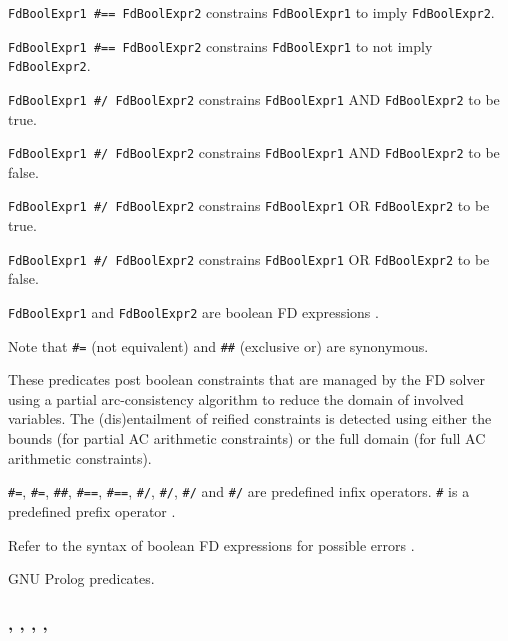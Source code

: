 \texttt{FdBoolExpr1 \#=={\gt} FdBoolExpr2} constrains
\texttt{FdBoolExpr1} to imply \texttt{FdBoolExpr2}.

\texttt{FdBoolExpr1 \#{\bs}=={\gt} FdBoolExpr2} constrains
\texttt{FdBoolExpr1} to not imply \texttt{FdBoolExpr2}.

\texttt{FdBoolExpr1 \#/{\bs} FdBoolExpr2} constrains \texttt{FdBoolExpr1}
AND \texttt{FdBoolExpr2} to be true.

\texttt{FdBoolExpr1 \#{\bs}/{\bs} FdBoolExpr2} constrains
\texttt{FdBoolExpr1} AND \texttt{FdBoolExpr2} to be false.

\texttt{FdBoolExpr1 \#{\bs}/ FdBoolExpr2} constrains \texttt{FdBoolExpr1}
OR \texttt{FdBoolExpr2} to be true.

\texttt{FdBoolExpr1 \#{\bs}{\bs}/ FdBoolExpr2} constrains
\texttt{FdBoolExpr1} OR \texttt{FdBoolExpr2} to be false.

\texttt{FdBoolExpr1} and \texttt{FdBoolExpr2} are boolean FD expressions
.

Note that \texttt{\#{\bs}{\lt}={\gt}} (not equivalent) and \texttt{\#\#}
(exclusive or) are synonymous.

These predicates post boolean constraints that are managed by the FD solver
using a partial arc-consistency algorithm to reduce the domain of involved
variables. The (dis)entailment of reified constraints is detected using
either the bounds (for partial AC arithmetic constraints) or the full domain
(for full AC arithmetic constraints).

\texttt{\#{\lt}={\gt}}, \texttt{\#{\bs}{\lt}={\gt}}, \texttt{\#\#},
\texttt{\#=={\gt}}, \texttt{\#{\bs}=={\gt}}, \texttt{\#/{\bs}},
\texttt{\#{\bs}/{\bs}}, \texttt{\#{\bs}/} and \texttt{\#{\bs}{\bs}/} are
predefined infix operators. \texttt{\#{\bs}} is a predefined prefix operator
.

\Errors

Refer to the syntax of boolean FD expressions for possible errors
.

\Portability

GNU Prolog predicates.

\subsubsection{,\label{fd-cardinality/2}
               ,
               ,
               , \\
               }

